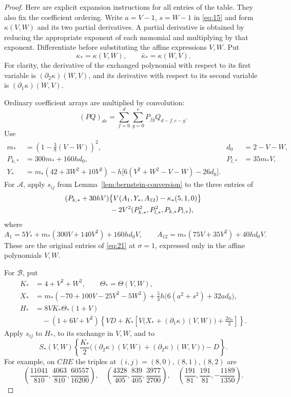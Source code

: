 \begin{proof}
Here are explicit expansion instructions for all entries of the table.
They also fix the coefficient ordering. Write
$a=V-1$, $s=W-1$ in \eqref{eq:15} and form $\kappa(V,W)$ and
its two partial derivatives. A partial derivative is obtained by
reducing the appropriate exponent of each monomial and multiplying by
that exponent. Differentiate before substituting the affine expressions
$V,W$. Put
\[
 \kappa_* =\kappa(V,W),\qquad \bar\kappa_* =\kappa(W,V).
\]
For clarity, the derivative of the exchanged polynomial with respect to
its first variable is $(\partial_2\kappa)(W,V)$, and its derivative
with respect to its second variable is $(\partial_1\kappa)(W,V)$.

Ordinary coefficient arrays are multiplied by convolution:
\[
 (PQ)_{de}=\sum_{f=0}^d\sum_{g=0}^e P_{fg}Q_{d-f,e-g}.
\]
Use
\[
\begin{aligned}
 m_*&=\left(1-\frac38(V-W)\right)^2,
       &d_0&=2-V-W,\\
 P_{k,*}&=300m_*+160h d_0,
       &P_{l,*}&=35m_*V,\\
 Y_*&=m_*(42+3W^2+10V^2)
       -h\bigl[6(V^2+W^2-V-W)-26d_0\bigr].
\end{aligned}
\]
For $\mathcal A$, apply $s_{ij}$ from
Lemma~\ref{lem:bernstein-conversion} to the three entries of
\[
\begin{aligned}
 &(P_{k,*}+30hV)
       \bigl\{V(A_1,Y_*,A_{12})-\kappa_*(5,1,0)\bigr\}\\
 &\hspace{22mm}-2V^2(P_{k,*}^2,P_{l,*}^2,P_{k,*}P_{l,*}),
\end{aligned}
\]
where
\[
 A_1=5Y_*+m_*(300V+140V^2)+160h d_0V,
 \qquad
 A_{12}=m_*(75V+35V^2)+40h d_0V.
\]
These are the original entries of \eqref{eq:21} at $\sigma=1$, expressed
only in the affine polynomials $V,W$.

For $\mathcal B$, put
\[
\begin{aligned}
 K_*&=4+V^2+W^2,\qquad \Theta_* =\Theta(V,W),\\
 X_*&=m_*(-70+100V-25V^2-5W^2)
       +\frac53h\bigl(6(a^2+s^2)+32a d_0\bigr),\\
 H_*&=8VK_*\Theta_*(1+V)\\
 &\quad-(1+6V+V^2)
       \left\{VD+K_*\left[V\bigl(X_*+(\partial_1\kappa)(V,W)\bigr)
                                     +\frac{2\kappa_*}{3}\right]\right\}.
\end{aligned}
\]
Apply $s_{ij}$ to $H_*$, to its exchange in $V,W$, and to
\[
 S_*(V,W)\left\{
       \frac{K_*}{2}\bigl((\partial_2\kappa)(V,W)
                        +(\partial_2\kappa)(W,V)\bigr)-D\right\}.
\]
For example, on $CBE$ the triples at $(i,j)=(8,0),(8,1),(8,2)$ are
\[
 \left(\frac{11041}{810},\frac{4063}{810},\frac{60557}{16200}\right),
 \quad
 \left(\frac{4328}{405},\frac{839}{405},\frac{3977}{2700}\right),
 \quad
 \left(\frac{191}{81},\frac{191}{81},-\frac{1189}{1350}\right).
\]


\end{proof}
